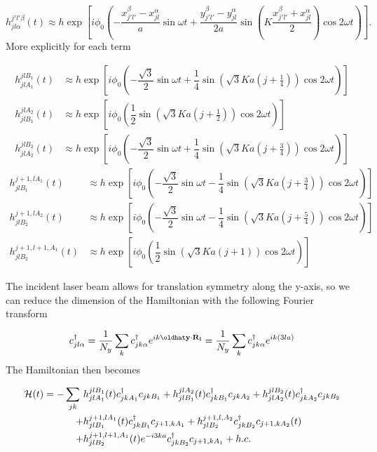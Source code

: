 \begin{equation}
  h_{jl\alpha}^{j'l'\beta} (t) \approx h \exp \left[ i \phi_0 \left(-\dfrac{x_{j'l'}^{\beta} - x_{jl}^{\alpha}}{a} \sin\omega t + \dfrac{y_{j'l'}^{\beta} - y_{jl}^{\alpha}}{2a} \sin\left(K \dfrac{x_{j'l'}^{\beta} + x_{jl}^{\alpha}}{2}\right) \cos 2\omega t \right) \right].
\end{equation}
More explicitly for each term

\begin{align}
  h_{jlA_1}^{jlB_1}(t) &\approx h \exp \left[ i\phi_0 \left(-\dfrac{\sqrt{3}}{2} \sin\omega t + \dfrac{1}{4} \sin(\sqrt{3}Ka(j+\tfrac{1}{4})) \cos 2\omega t \right) \right] \\
  h_{jlB_1}^{jlA_2}(t) &\approx h \exp \left[ i\phi_0 \left(\dfrac{1}{2} \sin(\sqrt{3}Ka(j+\tfrac{1}{2})) \cos 2\omega t \right) \right] \\
  h_{jlA_2}^{jlB_2}(t) &\approx h \exp \left[ i\phi_0 \left(-\dfrac{\sqrt{3}}{2} \sin\omega t + \dfrac{1}{4} \sin(\sqrt{3}Ka(j+\tfrac{3}{4})) \cos 2\omega t \right) \right]
\end{align}
\begin{align}
  h_{jlB_1}^{j+1,lA_1}(t) &\approx h \exp \left[ i\phi_0 \left(-\dfrac{\sqrt{3}}{2} \sin\omega t - \dfrac{1}{4} \sin(\sqrt{3}Ka(j+\tfrac{3}{4})) \cos 2\omega t \right) \right] \\
  h_{jlB_2}^{j+1,lA_2}(t) &\approx h \exp \left[ i\phi_0 \left(-\dfrac{\sqrt{3}}{2}\sin\omega t -\dfrac{1}{4} \sin(\sqrt{3}Ka(j+\tfrac{5}{4})) \cos 2\omega t \right) \right] \\
  h_{jlB_2}^{j+1,l+1,A_1}(t) &\approx h \exp \left[ i\phi_0 \left(\dfrac{1}{2} \sin(\sqrt{3}Ka(j+1)) \cos 2\omega t \right) \right]
\end{align}

The incident laser beam allows for translation symmetry along the y-axis, so we can reduce the dimension of the Hamiltonian with the following Fourier transform

\begin{equation}
  \cc_{jl\alpha} = \dfrac{1}{N_y} \sum_k \cc_{jk\alpha} e^{ik\hat{y}\cdot\vec{R_l}} = \dfrac{1}{N_y} \sum_k \cc_{jk\alpha} e^{ik(3la)}
\end{equation}
The Hamiltonian then becomes

\begin{equation}
\begin{split}
  \mathcal{H} (t) = -\sum_{jk} \ &h_{jlA_1}^{jlB_1}(t) c^{\dagger}_{jkA_1} c_{jkB_1} + h_{jlB_1}^{jlA_2}(t) c^{\dagger}_{jkB_1} c_{jkA_2} + h_{jlA_2}^{jlB_2}(t) c^{\dagger}_{jkA_2} c_{jkB_2} \\
      + &h_{jlB_1}^{j+1,lA_1}(t) c^{\dagger}_{jkB_1} c_{j+1,kA_1} + h_{jlB_2}^{j+1,l,A_2} c^{\dagger}_{jkB_2} c_{j+1,kA_2}(t) \\
      + &h_{jlB_2}^{j+1,l+1,A_1}(t) e^{-i3ka} c^{\dagger}_{jkB_2} c_{j+1,kA_1} + h.c.
\end{split}
\end{equation}

